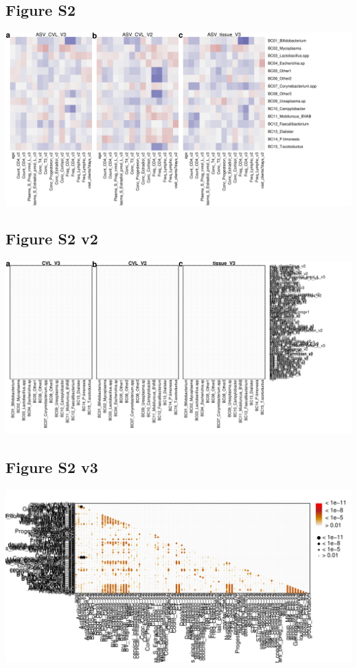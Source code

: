\documentclass[
]{article}
\begin{document}
\clearpage

\hypertarget{figure-s2}{%
\subsection{Figure S2}\label{figure-s2}}

\includegraphics[width=1\linewidth]{manuscript_template_files/figure-latex/unnamed-chunk-9-1}

\clearpage

\hypertarget{figure-s2-v2}{%
\subsection{Figure S2 v2}\label{figure-s2-v2}}

\includegraphics[width=1\linewidth]{manuscript_template_files/figure-latex/unnamed-chunk-10-1}

\clearpage

\hypertarget{figure-s2-v3}{%
\subsection{Figure S2 v3}\label{figure-s2-v3}}

\includegraphics[width=1\linewidth]{manuscript_template_files/figure-latex/unnamed-chunk-11-1}
\end{document}

